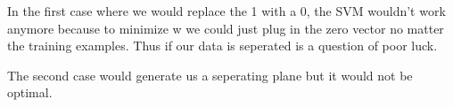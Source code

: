 In the first case where  we would replace the 1 with a 0, the SVM wouldn't work anymore because to minimize w we could just plug in the zero vector no matter the training examples. Thus if our data is seperated is a question of poor luck.

The second case would generate us a seperating plane but it would not be optimal.